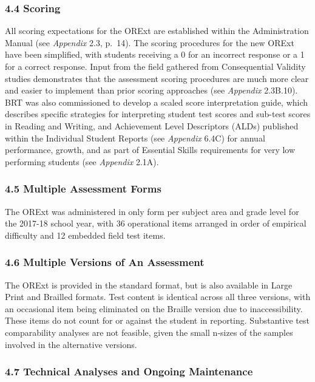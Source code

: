 \documentclass[]{article}
\begin{document}
\subsubsection{4.4 Scoring}\label{scoring}

All scoring expectations for the ORExt are established within the
Administration Manual (see \emph{Appendix} 2.3, p.~14). The scoring
procedures for the new ORExt have been simplified, with students
receiving a 0 for an incorrect response or a 1 for a correct response.
Input from the field gathered from Consequential Validity studies
demonstrates that the assessment scoring procedures are much more clear
and easier to implement than prior scoring approaches (see
\emph{Appendix} 2.3B.10). BRT was also commissioned to develop a scaled
score interpretation guide, which describes specific strategies for
interpreting student test scores and sub-test scores in Reading and
Writing, and Achievement Level Descriptors (ALDs) published within the
Individual Student Reports (see \emph{Appendix} 6.4C) for annual
performance, growth, and as part of Essential Skills requirements for
very low performing students (see \emph{Appendix} 2.1A).

\subsubsection{4.5 Multiple Assessment
Forms}\label{multiple-assessment-forms}

The ORExt was administered in only form per subject area and grade level
for the 2017-18 school year, with 36 operational items arranged in order
of empirical difficulty and 12 embedded field test items.

\subsubsection{4.6 Multiple Versions of An
Assessment}\label{multiple-versions-of-an-assessment}

The ORExt is provided in the standard format, but is also available in
Large Print and Brailled formats. Test content is identical across all
three versions, with an occasional item being eliminated on the Braille
version due to inaccessibility. These items do not count for or against
the student in reporting. Substantive test comparability analyses are
not feasible, given the small n-sizes of the samples involved in the
alternative versions.

\subsubsection{4.7 Technical Analyses and Ongoing
Maintenance}\label{technical-analyses-and-ongoing-maintenance}
\end{document}
